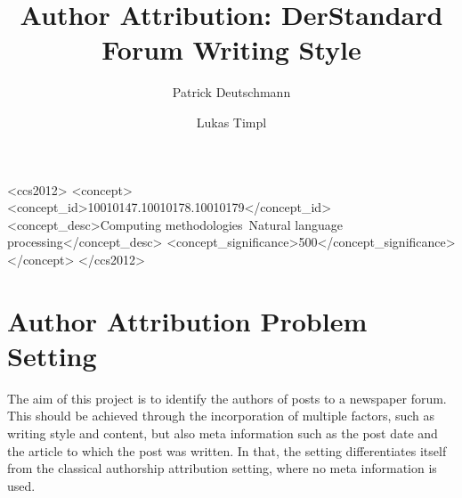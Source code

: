 \documentclass[acmsmall]{acmart}
\begin{document}
\title{Author Attribution: DerStandard Forum Writing Style}

\author{Patrick Deutschmann}

\author{Lukas Timpl}


\begin{abstract}
\end{abstract}

\begin{CCSXML}
<ccs2012>
   <concept>
       <concept_id>10010147.10010178.10010179</concept_id>
       <concept_desc>Computing methodologies~Natural language processing</concept_desc>
       <concept_significance>500</concept_significance>
       </concept>
 </ccs2012>
\end{CCSXML}



\maketitle


\section{Author Attribution Problem Setting}

The aim of this project is to identify the authors of posts to a newspaper forum. This should be achieved through the incorporation of multiple factors, such as writing style and content, but also meta information such as the post date and the article to which the post was written. In that, the setting differentiates itself from the classical authorship attribution setting, where no meta information is used. 
\end{document}
